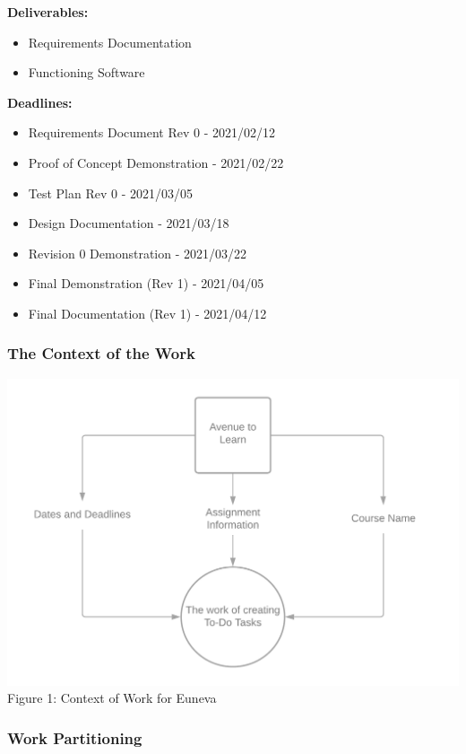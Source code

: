 \documentclass[12pt, titlepage]{article}
\begin{document}
\noindent \textbf{Deliverables:}
\begin{itemize}
\item Requirements Documentation
\item Functioning Software
\end{itemize}

\noindent \textbf{Deadlines:}
\begin{itemize}
\item Requirements Document Rev 0 - 2021/02/12
\item Proof of Concept Demonstration - 2021/02/22
\item Test Plan Rev 0 - 2021/03/05
\item Design Documentation - 2021/03/18
\item Revision 0 Demonstration - 2021/03/22
\item Final Demonstration (Rev 1) - 2021/04/05
\item Final Documentation (Rev 1) - 2021/04/12 
\end{itemize}

\subsubsection{The Context of the Work}

\begin{center}
\includegraphics[scale=0.2]{Context_Of_Work}
Figure 1: Context of Work for Euneva
\end{center}

\subsubsection{Work Partitioning}
\end{document}
